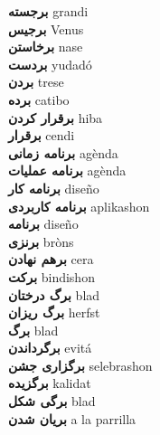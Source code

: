 \textbf{ برجسته  } grandi \\
\textbf{ برجیس  } Venus \\
\textbf{ برخاستن  } nase \\
\textbf{ بردست  } yudadó \\
\textbf{ بردن  } trese \\
\textbf{ برده  } catibo \\
\textbf{ برقرار کردن  } hiba \\
\textbf{ برقرار  } cendi \\
\textbf{ برنامه زمانی  } agènda \\
\textbf{ برنامه عملیات  } agènda \\
\textbf{ برنامه کار  } diseño \\
\textbf{ برنامه کاربردی  } aplikashon \\
\textbf{ برنامه  } diseño \\
\textbf{ برنزی  } bròns \\
\textbf{ برهم نهادن  } cera \\
\textbf{ برکت  } bindishon \\
\textbf{ برگ درختان  } blad \\
\textbf{ برگ ریزان  } herfst \\
\textbf{ برگ  } blad \\
\textbf{ برگرداندن  } evitá \\
\textbf{ برگزاری جشن  } selebrashon \\
\textbf{ برگزیده  } kalidat \\
\textbf{ برگی شکل  } blad \\
\textbf{ بریان شدن  } a la parrilla \\
